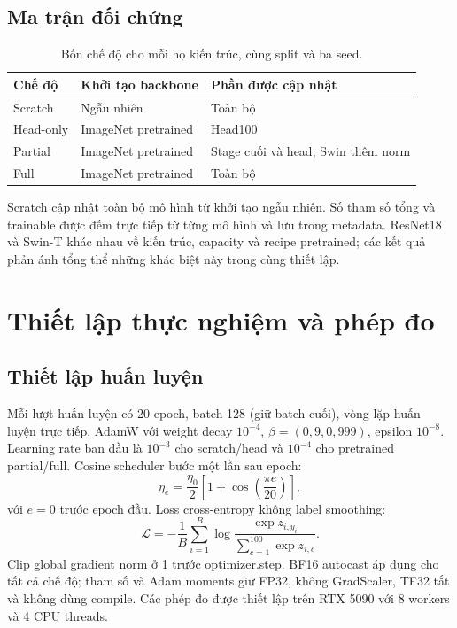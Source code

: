 \documentclass[12pt,a4paper]{report}
\numberwithin{equation}{chapter}
\begin{document}
\section{Ma trận đối chứng}
\begin{table}[htbp]\centering
\begin{tabular}{lll}
\toprule
Chế độ & Khởi tạo backbone & Phần được cập nhật\\\midrule
Scratch & Ngẫu nhiên & Toàn bộ\\
Head-only & ImageNet pretrained & Head100\\
Partial & ImageNet pretrained & Stage cuối và head; Swin thêm norm\\
Full & ImageNet pretrained & Toàn bộ\\\bottomrule
\end{tabular}
\caption{Bốn chế độ cho mỗi họ kiến trúc, cùng split và ba seed.}
\end{table}
Scratch cập nhật toàn bộ mô hình từ khởi tạo ngẫu nhiên. Số tham số tổng và
trainable được đếm trực tiếp từ từng mô hình và lưu trong metadata.
ResNet18 và Swin-T khác nhau về kiến trúc, capacity và recipe pretrained;
các kết quả phản ánh tổng thể những khác biệt này trong cùng thiết lập.

\chapter{Thiết lập thực nghiệm và phép đo}
\section{Thiết lập huấn luyện}
Mỗi lượt huấn luyện có 20 epoch, batch 128 (giữ batch cuối), vòng lặp huấn luyện trực tiếp,
AdamW với weight decay $10^{-4}$, $\beta=(0{,}9,0{,}999)$, epsilon $10^{-8}$.
Learning rate ban đầu là $10^{-3}$ cho scratch/head và $10^{-4}$ cho
pretrained partial/full. Cosine scheduler bước một lần sau epoch:
\begin{equation}
\eta_e=\frac{\eta_0}{2}\left[1+\cos\left(\frac{\pi e}{20}\right)\right],
\end{equation}
với $e=0$ trước epoch đầu. Loss cross-entropy không label smoothing:
\begin{equation}
\mathcal{L}=-\frac1B\sum_{i=1}^{B}\log
\frac{\exp z_{i,y_i}}{\sum_{c=1}^{100}\exp z_{i,c}}.
\end{equation}
Clip global gradient norm ở 1 trước optimizer.step. BF16 autocast áp dụng
cho tất cả chế độ; tham số và Adam moments giữ FP32, không GradScaler,
TF32 tắt và không dùng compile. Các phép đo được thiết lập trên RTX 5090 với
8 workers và 4 CPU threads.
\end{document}
